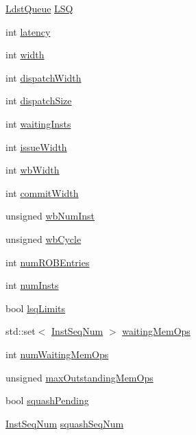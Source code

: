 \begin{DoxyCompactItemize}
\item 
\hyperlink{classLWBackEnd_a4c90230ea80fdcedea6e4fb9b43009cd}{LdstQueue} \hyperlink{classLWBackEnd_a2d033f80e55d1123d747d40f026042aa}{LSQ}
\item 
int \hyperlink{classLWBackEnd_a9c5bf07170b5d91cfb44d4bfd0517128}{latency}
\item 
int \hyperlink{classLWBackEnd_a2474a5474cbff19523a51eb1de01cda4}{width}
\item 
int \hyperlink{classLWBackEnd_aa304d4c426ea2bba52be0a3c0b9811e3}{dispatchWidth}
\item 
int \hyperlink{classLWBackEnd_a32343e1e9e56c17bb868f861f9b8927d}{dispatchSize}
\item 
int \hyperlink{classLWBackEnd_a9b9600f987928599f17c3549b0de891a}{waitingInsts}
\item 
int \hyperlink{classLWBackEnd_a171bac1210be84c8811563ab35209fce}{issueWidth}
\item 
int \hyperlink{classLWBackEnd_a20d3086e6bcdc826d99143ac7c9b23a4}{wbWidth}
\item 
int \hyperlink{classLWBackEnd_a328db48cdab1c2a18d8432b647e2785b}{commitWidth}
\item 
unsigned \hyperlink{classLWBackEnd_a5fa0799bf5569437190dd1eda1d62b7b}{wbNumInst}
\item 
unsigned \hyperlink{classLWBackEnd_ad2c7b2687f864f2b7359eb393276996f}{wbCycle}
\item 
int \hyperlink{classLWBackEnd_ae40678133a160367f2207f07975ca0f3}{numROBEntries}
\item 
int \hyperlink{classLWBackEnd_a358c879c68910efe5300c4515df35b6c}{numInsts}
\item 
bool \hyperlink{classLWBackEnd_a448f97a01f3a53c40ed453a5e27c02ab}{lsqLimits}
\item 
std::set$<$ \hyperlink{inst__seq_8hh_a258d93d98edaedee089435c19ea2ea2e}{InstSeqNum} $>$ \hyperlink{classLWBackEnd_af9ed5543b904bf082a41d640654588e5}{waitingMemOps}
\item 
int \hyperlink{classLWBackEnd_a96e0941aaf8a2dd157434967a452531b}{numWaitingMemOps}
\item 
unsigned \hyperlink{classLWBackEnd_ad6fbab05ce17a32ecda942c0cf4398ae}{maxOutstandingMemOps}
\item 
bool \hyperlink{classLWBackEnd_a2aafb6fc593b04986eeed845923a8953}{squashPending}
\item 
\hyperlink{inst__seq_8hh_a258d93d98edaedee089435c19ea2ea2e}{InstSeqNum} \hyperlink{classLWBackEnd_a34292b1418c46ca63c892e7826510d77}{squashSeqNum}

\end{DoxyCompactItemize}

